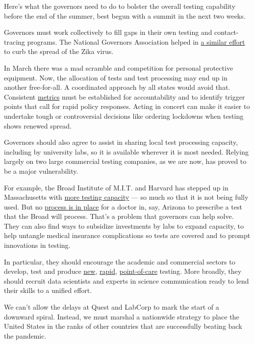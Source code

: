 Here's what the governors need to do to bolster the overall testing
capability before the end of the summer, best begun with a summit in the
next two weeks.

Governors must work collectively to fill gaps in their own testing and
contact-tracing programs. The National Governors Association helped in
\href{https://perma.cc/TC92-QCKG}{a similar effort} to curb the spread
of the Zika virus.

In March there was a mad scramble and competition for personal
protective equipment. Now, the allocation of tests and test processing
may end up in another free-for-all. A coordinated approach by all states
would avoid that. Consistent
\href{http://covid-local.org/metrics}{metrics} must be established for
accountability and to identify trigger points that call for rapid policy
responses. Acting in concert can make it easier to undertake tough or
controversial decisions like ordering lockdowns when testing shows
renewed spread.

Governors should also agree to assist in sharing local test processing
capacity, including by university labs, so it is available wherever it
is most needed. Relying largely on two large commercial testing
companies, as we are now, has proved to be a major vulnerability.

For example, the Broad Institute of M.I.T. and Harvard has stepped up in
Massachusetts with
\href{https://covid19-testing.broadinstitute.org/}{more testing
capacity} --- so much so that it is not being fully used. But no
\href{https://www.nytimes.com/2020/05/21/health/coronavirus-testing-lab-capacity.html}{process
is in place} for a doctor in, say, Arizona to prescribe a test that the
Broad will process. That's a problem that governors can help solve. They
can also find ways to subsidize investments by labs to expand capacity,
to help untangle medical insurance complications so tests are covered
and to prompt innovations in testing.

In particular, they should encourage the academic and commercial sectors
to develop, test and produce
\href{https://www.reuters.com/article/us-health-coronavirus-smiths-group/smiths-to-help-make-blood-based-coronavirus-test-in-britain-idUSKBN2491K0}{new},
\href{http://perma.cc/5DUZ-GUBV}{rapid},
\href{http://perma.cc/4V5X-B7CN}{point-of-care} testing. More broadly,
they should recruit data scientists and experts in science communication
ready to lend their skills to a unified effort.

We can't allow the delays at Quest and LabCorp to mark the start of a
downward spiral. Instead, we must marshal a nationwide strategy to place
the United States in the ranks of other countries that are successfully
beating back the pandemic.


